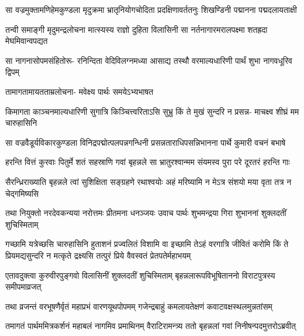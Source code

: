 \fourlineindentedshloka
{सा वज्रमुक्तामणिहेमकुण्डला}
{मृदुक्रमा भ्रातृनियोगचोदिता}
{प्रदक्षिणावर्ततनुः शिखण्डिनी}
{पद्मानना पद्मदलायताक्षी}


\fourlineindentedshloka
{तन्वी समाङ्गी मृदुमन्द्रलोचना}
{मात्स्यस्य राज्ञो दुहिता विलासिनी}
{सा नर्तनागारमरालपक्ष्मा}
{शतह्रदा मेघमिवान्वपद्यत}


\fourlineindentedshloka
{सा नागनासोपमसंहितोरू-}
{रनिन्दिता वेदिविलग्नमध्या}
{आसाद्य तस्थौ वरमाल्यधारिणी}
{पार्थं शुभा नागवधूरिव द्विपम्}


\onelineindentedshloka
{तामागतामायतताम्रलोचना-}
{मवेक्ष्य पार्थः समयेऽभ्यभाषत}


\fourlineindentedshloka
{किमागता काञ्चनमाल्यधारिणी}
{सुगात्रि किञ्चित्त्वरिताऽसि सुभ्रु}
{किं ते मुखं सुन्दरि न प्रसन्न-}
{माचक्ष्व शीघ्रं मम चारुहासिनि}



\fourlineindentedshloka
{सा वज्रवैडूर्यविकारकुण्डला}
{विनिद्रपद्मोत्पलपन्नगन्धिनी}
{प्रसन्नताराधिपसन्निभानना}
{पार्थे कुमारी वचनं बभाषे}




\fourlineindentedshloka
{हरन्ति वित्तं कुरवाः पितुर्मे}
{शतं सहस्राणि गवां बृहन्नले}
{सा भ्रातुरश्वान्मम संयमस्व}
{पुरा परे दूरतरं हरन्ति गाः}


\fourlineindentedshloka
{सैरन्ध्रिराख्याति बृहन्नले त्वां}
{सुशिक्षिता सङ्ग्रहणे रथाश्वयोः}
{अहं मरिष्यामि न मेऽत्र संशयो}
{मया वृता तत्र न चेद्गमिष्यसि}



\fourlineindentedshloka
{तथा नियुक्तो नरदेवकन्यया}
{नरोत्तमः प्रीतमना धनञ्जयः}
{उवाच पार्थः शुभमन्द्रया गिरा}
{शुभाननां शुक्लदतीं शुचिस्मिताम्}


\sixlineindentedshloka
{गच्छामि यत्रेच्छसि चारुहासिनि}
{हुताशनं प्रज्वलितं विशामि वा}
{इच्छामि तेऽहं वरगात्रि जीवितं}
{करोमि किं ते प्रियमद्यसुन्दरि}
{न मत्कृते द्रक्ष्यसि तत्पुरं प्रिये}
{वैवस्वतं प्रेतपतेर्महाभयम्}



\fourlineindentedshloka
{एतावदुक्त्वा कुरुवीरपुङ्गवो}
{विलासिनीं शुक्लदतीं शुचिस्मिताम्}
{बृहन्नलारूपविभूषिताननो}
{विराटपुत्रस्य समीपमाव्रजत्}


\fourlineindentedshloka
{तथा व्रजन्तं वरभूषणैर्वृतं}
{महाप्रभं वारणयूथपोपमम्}
{गजेन्द्रबाहुं कमलायतेक्षणं}
{कवाटवक्षस्थलमुन्नतांसम्}


\fourlineindentedshloka
{तमागतं पार्थममित्रकर्शनं}
{महाबलं नागमिव प्रमाथिनम्}
{वैराटिरामन्त्र्य ततो बृहन्नलां}
{गवां निनीषन्पदमुत्तरोऽब्रवीत्}


